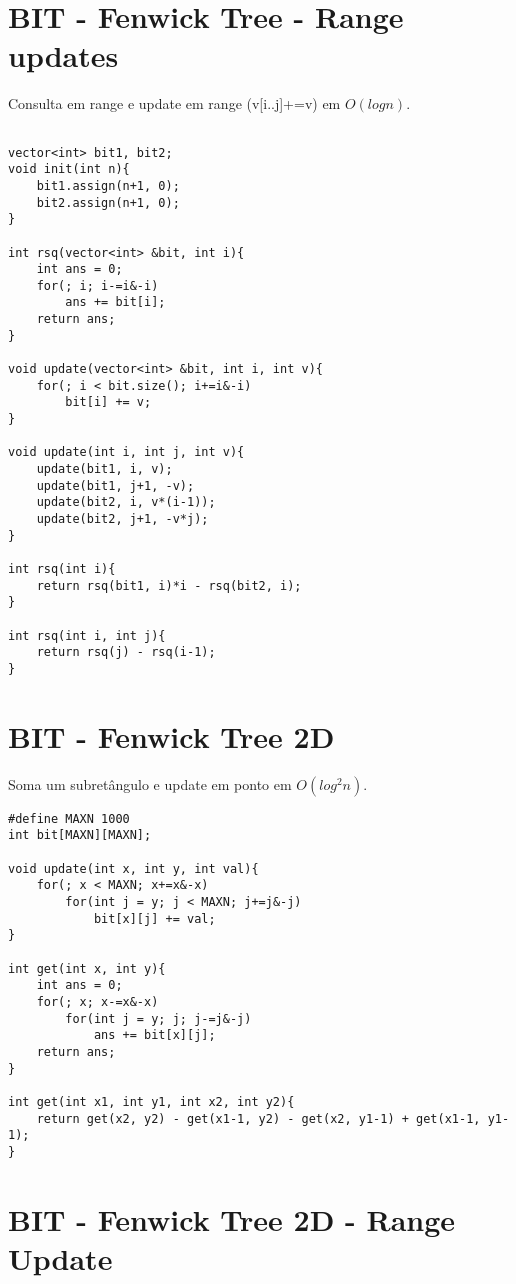 \section{BIT - Fenwick Tree - Range updates}

Consulta em range e update em range (v[i..j]+=v) em $O(logn)$.
\begin{multicols}{2}
	\begin{lstlisting}

vector<int> bit1, bit2;
void init(int n){
	bit1.assign(n+1, 0);
	bit2.assign(n+1, 0);
}

int rsq(vector<int> &bit, int i){
	int ans = 0;
	for(; i; i-=i&-i)
		ans += bit[i];
	return ans;
}

void update(vector<int> &bit, int i, int v){
	for(; i < bit.size(); i+=i&-i)
		bit[i] += v;
}

void update(int i, int j, int v){
	update(bit1, i, v);
	update(bit1, j+1, -v);
	update(bit2, i, v*(i-1));
	update(bit2, j+1, -v*j);	
}

int rsq(int i){
	return rsq(bit1, i)*i - rsq(bit2, i);
}

int rsq(int i, int j){
	return rsq(j) - rsq(i-1);
}
	\end{lstlisting}
\end{multicols}

\section{BIT - Fenwick Tree 2D}

Soma um subretângulo e update em ponto em $O(log^2n)$.
\begin{multicols}{2}
	\begin{lstlisting}
#define MAXN 1000
int bit[MAXN][MAXN];

void update(int x, int y, int val){
	for(; x < MAXN; x+=x&-x)
		for(int j = y; j < MAXN; j+=j&-j)
			bit[x][j] += val;
}

int get(int x, int y){
	int ans = 0;
	for(; x; x-=x&-x)
		for(int j = y; j; j-=j&-j)
			ans += bit[x][j];
	return ans;
}

int get(int x1, int y1, int x2, int y2){
	return get(x2, y2) - get(x1-1, y2) - get(x2, y1-1) + get(x1-1, y1-1);
}

	\end{lstlisting}
\end{multicols}

\section{BIT - Fenwick Tree 2D - Range Update}

